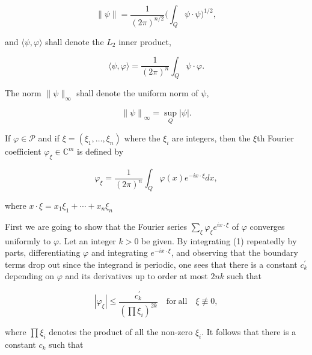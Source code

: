 \begin{equation}
\tag{10}\label{eq:6.15:10}
\|\psi\|=\frac{1}{(2\pi)^{n/2}}\biggl(\int_{Q}\psi\cdot\psi\biggr)^{1/2},
\end{equation}

and  $ \langle\psi,\varphi\rangle $ shall denote the  $ L_{2} $ inner product,

\begin{equation}
\tag{11}\label{eq:6.15:11}
\langle\psi,\varphi\rangle=\frac{1}{(2\pi)^{n}}\int_{Q}\psi\cdot\varphi.
\end{equation}

The norm  $ \|\psi\|_{\infty} $ shall denote the uniform norm of  $ \psi $,

\begin{equation}
\tag{12}\label{eq:6.15:12}
\left\lVert{\psi}\right\rVert_{\infty}=\sup_{Q}\left\lvert{\psi}\right\rvert.
\end{equation}

\label{thm:6.16} If $\varphi \in \mathcal{P}$ and if $\xi = (\xi_1, \ldots, \xi_n)$ where the $\xi_i$ are integers, then the $\xi$th Fourier coefficient $\varphi_{\xi} \in \mathbb{C}^m$ is defined by

\begin{equation}
\tag{1}\label{eq:6.16:1}
\varphi_{\xi}=\frac{1}{(2\pi)^{n}}\int_{Q}\varphi(x)e^{-i x\cdot\xi}d x,
\end{equation}

where  $ x \cdot \xi = x_{1} \xi_{1} + \cdots + x_{n} \xi_{n} $

First we are going to show that the Fourier series  $ \sum_{\xi} \varphi_{\xi} e^{ix\cdot\xi} $ of  $ \varphi $ converges uniformly to $ \varphi $. Let an integer  $ k > 0 $ be given. By integrating (1) repeatedly by parts, differentiating  $ \varphi $ and integrating  $ e^{-ix\cdot\xi} $, and observing that the boundary terms drop out since the integrand is periodic, one sees that there is a constant  $ c_{k}^{\prime} $ depending on  $ \varphi $ and its derivatives up to order at most  $ 2nk $ such that

\begin{equation}
\tag{2}\label{eq:6.16:2}
|\varphi_{\xi}|\leq\frac{c_{k}^{\prime}}{(\prod\xi_{i})^{2k}}\quad\mathrm{for\ all}\quad\xi\not\equiv0,
\end{equation}

where $\prod\xi_{i}$ denotes the product of all the non-zero $\xi_{i}$. It follows that there is a constant $c_{k}$ such that

